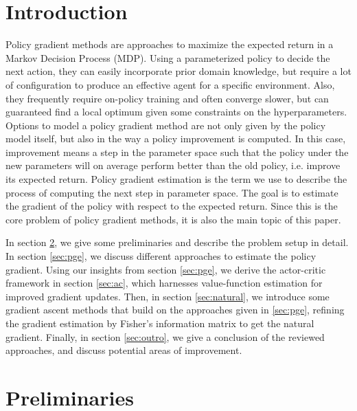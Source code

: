 \section{Introduction}
\label{intro}

Policy gradient methods are approaches to maximize the expected return in a Markov Decision Process (MDP). 
Using a parameterized policy to decide the next action, they can easily incorporate prior domain knowledge, but require a lot of configuration to produce an effective agent for a specific environment. 
Also, they frequently require on-policy training and often converge slower, but can guaranteed find a local optimum given some constraints on the hyperparameters. 
Options to model a policy gradient method are not only given by the policy model itself, but also in the way a policy improvement is computed. 
In this case, improvement means a step in the parameter space such that the policy under the new parameters will on average perform better than the old policy, i.e. improve its expected return. 
Policy gradient estimation is the term we use to describe the process of computing the next step in parameter space. 
The goal is to estimate the gradient of the policy with respect to the expected return. 
Since this is the core problem of policy gradient methods, it is also the main topic of this paper.

In section \ref{sec:prel}, we give some preliminaries and describe the problem setup in detail. 
In section \ref{sec:pge}, we discuss different approaches to estimate the policy gradient. 
Using our insights from section \ref{sec:pge}, we derive the actor-critic framework in section \ref{sec:ac}, which harnesses value-function estimation for improved gradient updates. 
Then, in section \ref{sec:natural}, we introduce some gradient ascent methods that build on the approaches given in \ref{sec:pge}, refining the gradient estimation by Fisher's information matrix to get the natural gradient. 
Finally, in section \ref{sec:outro}, we give a conclusion of the reviewed approaches, and discuss potential areas of improvement.

\section{Preliminaries}
\label{sec:prel}

